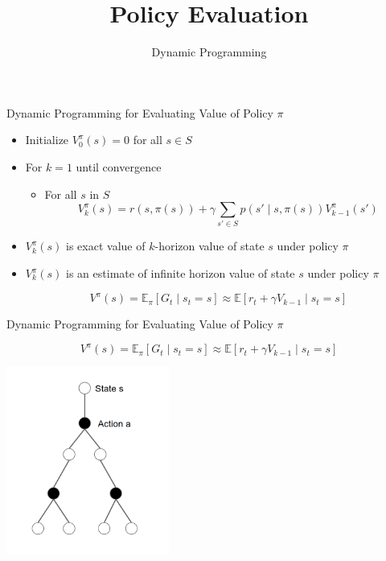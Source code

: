 


\title[Reinforcement Learning: Policy Evaluation]{Policy Evaluation}
\subtitle{Dynamic Programming}




	
	\maketitle

\begin{frame}[c]{Dynamic Programming for Evaluating Value of Policy $\pi$}

\begin{itemize}
	\item Initialize $V^\pi_0(s) = 0$ for all $s\in S$
	\item For $k=1$ until convergence
	\begin{itemize}
		\item For all $s$ in $S$
		$$V^\pi_k (s)  = r(s, \pi(s)) + \gamma \sum_{s' \in S} p(s' \mid s, \pi(s)) V^\pi_{k-1} (s') $$
	\end{itemize}
	\item $V^\pi_k (s)$ is exact value of $k$-horizon value of state $s$ under policy $\pi$
	\item $V^\pi_k (s)$ is an estimate of infinite horizon value of state $s$ under policy $\pi$
	
	$$V^\pi (s) = \mathbb{E}_\pi [G_t \mid s_t = s] \approx \mathbb{E} [r_t + \gamma V_{k-1} \mid s_t = s]$$
\end{itemize}



\end{frame}
\begin{frame}[c]{Dynamic Programming for Evaluating Value of Policy $\pi$}

$$V^\pi (s) = \mathbb{E}_\pi [G_t \mid s_t = s] \approx \mathbb{E} [r_t + \gamma V_{k-1} \mid s_t = s]$$

\begin{center}
	\includegraphics[width=0.4\textwidth]{images/state_action_graph.png}
\end{center}



\end{frame}
